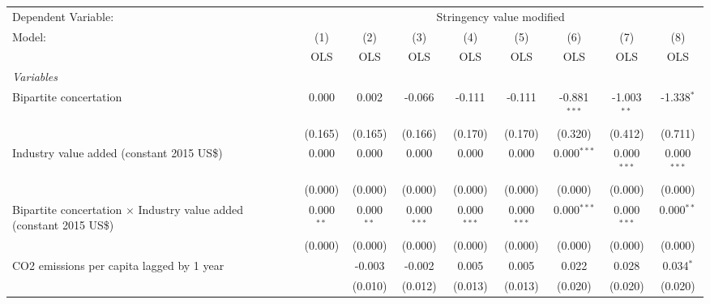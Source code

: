 
\begingroup
\centering
\begin{tabular}{lcccccccc}
   \toprule
   Dependent Variable: & \multicolumn{8}{c}{Stringency value modified}\\
   Model:                                                                      & (1)          & (2)          & (3)           & (4)           & (5)           & (6)            & (7)           & (8)\\  
                                                                               &  OLS         & OLS          & OLS           & OLS           & OLS           & OLS            & OLS           & OLS\\  
   \midrule
   \emph{Variables}\\
   Bipartite concertation                                                      & 0.000        & 0.002        & -0.066        & -0.111        & -0.111        & -0.881$^{***}$ & -1.003$^{**}$ & -1.338$^{*}$\\   
                                                                               & (0.165)      & (0.165)      & (0.166)       & (0.170)       & (0.170)       & (0.320)        & (0.412)       & (0.711)\\   
   Industry value added (constant 2015 US\$)                                   & 0.000        & 0.000        & 0.000         & 0.000         & 0.000         & 0.000$^{***}$  & 0.000$^{***}$ & 0.000$^{***}$\\   
                                                                               & (0.000)      & (0.000)      & (0.000)       & (0.000)       & (0.000)       & (0.000)        & (0.000)       & (0.000)\\   
   Bipartite concertation $\times$ Industry value added (constant 2015 US\$)   & 0.000$^{**}$ & 0.000$^{**}$ & 0.000$^{***}$ & 0.000$^{***}$ & 0.000$^{***}$ & 0.000$^{***}$  & 0.000$^{***}$ & 0.000$^{**}$\\   
                                                                               & (0.000)      & (0.000)      & (0.000)       & (0.000)       & (0.000)       & (0.000)        & (0.000)       & (0.000)\\   
   CO2 emissions per capita lagged by 1 year                                   &              & -0.003       & -0.002        & 0.005         & 0.005         & 0.022          & 0.028         & 0.034$^{*}$\\   
                                                                               &              & (0.010)      & (0.012)       & (0.013)       & (0.013)       & (0.020)        & (0.020)       & (0.020)\\   

\end{tabular}

